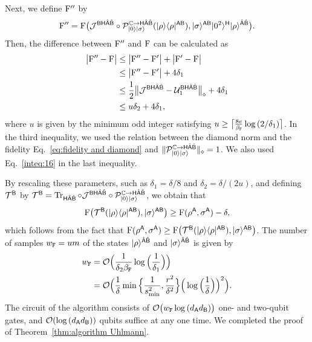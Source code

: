 Next, we define ${\mathrm{F}}''$ by 
\begin{align}
    {\mathrm{F}}'' = {\mathrm{F}}\big({\mathcal{J}}^{{\mathsf{B}}{\mathsf{H}}\hat{{\mathsf{A}}}\hat{{\mathsf{B}}}}\circ{\mathcal{P}}_{|0\rangle|\sigma\rangle}^{\mathbb{C}\rightarrow{\mathsf{H}}\hat{{\mathsf{A}}}\hat{{\mathsf{B}}}}(|\rho\rangle\langle\rho|^{{\mathsf{A}}{\mathsf{B}}}), |\sigma\rangle^{{\mathsf{A}}{\mathsf{B}}}|0^2\rangle^{\mathsf{H}}|\rho\rangle^{\hat{{\mathsf{A}}}\hat{{\mathsf{B}}}}\big).
\end{align} 
Then, the difference between ${\mathrm{F}}''$ and ${\mathrm{F}}$ can be calculated as
\begin{align}
    \big|{\mathrm{F}}'' - {\mathrm{F}}\big| 
    &\leq \big|{\mathrm{F}}'' - {\mathrm{F}}'\big| + \big|{\mathrm{F}}' - {\mathrm{F}}\big| \\
    &\leq\big|{\mathrm{F}}'' - {\mathrm{F}}'\big| + 4\delta_1 \\
    &\leq \frac{1}{2}\big\|{\mathcal{J}}^{{\mathsf{B}}{\mathsf{H}}\hat{{\mathsf{A}}}\hat{{\mathsf{B}}}} - {\mathcal{U}}_1^{{\mathsf{B}}{\mathsf{H}}\hat{{\mathsf{A}}}\hat{{\mathsf{B}}}} \big\|_\diamond + 4\delta_1 \\
    \label{inteq:106}
    &\leq u\delta_2 + 4\delta_1,
\end{align}
where $u$ is given by the minimum odd integer satisfying $u \geq \big\lceil\frac{8e}{\beta_{\mathtt{F}}}\log{(2/\delta_1)}\big\rceil$.
In the third inequality, we used the relation between the diamond norm and the fidelity Eq.~\eqref{eq:fidelity and diamond} and $\|{\mathcal{P}}_{|0\rangle|\sigma\rangle}^{\mathbb{C}\rightarrow{\mathsf{H}}\hat{{\mathsf{A}}}\hat{{\mathsf{B}}}}\|_\diamond = 1$.
We also used Eq.~\eqref{inteq:16} in the last inequality.



By rescaling these parameters, such as $\delta_1 = \delta/8$ and $\delta_2 = \delta/(2u)$, and defining ${\mathcal{T}}^{\mathsf{B}}$ by ${\mathcal{T}}^{\mathsf{B}} = \operatorname{Tr}_{{\mathsf{H}}\hat{{\mathsf{A}}}\hat{{\mathsf{B}}}}\circ{\mathcal{J}}^{{\mathsf{B}}{\mathsf{H}}\hat{{\mathsf{A}}}\hat{{\mathsf{B}}}}\circ{\mathcal{P}}_{|0\rangle|\sigma\rangle}^{\mathbb{C}\rightarrow{\mathsf{H}}\hat{{\mathsf{A}}}\hat{{\mathsf{B}}}}$, we obtain that
\begin{align}
    {\mathrm{F}}\big({\mathcal{T}}^{\mathsf{B}}(|\rho\rangle\langle\rho|^{{\mathsf{A}}{\mathsf{B}}}), |\sigma\rangle^{{\mathsf{A}}{\mathsf{B}}}\big)
    \geq {\mathrm{F}}(\rho^{\mathsf{A}}, \sigma^{\mathsf{A}}) - \delta,
\end{align}
which follows from the fact that ${\mathrm{F}}(\rho^{\mathsf{A}}, \sigma^{\mathsf{A}}) \geq {\mathrm{F}}\big({\mathcal{T}}^{\mathsf{B}}(|\rho\rangle\langle\rho|^{{\mathsf{A}}{\mathsf{B}}}), |\sigma\rangle^{{\mathsf{A}}{\mathsf{B}}}\big)$.
The number of samples $w_{\mathtt{F}} = um$ of the states $|\rho\rangle^{\hat{{\mathsf{A}}}\hat{{\mathsf{B}}}}$ and $|\sigma\rangle^{\hat{{\mathsf{A}}}\hat{{\mathsf{B}}}}$ is given by
\begin{align}
    w_{\mathtt{F}} &= {\mathcal{O}}\Big(\frac{1}{\delta_2\beta_{\mathtt{F}}}\log{\Big(\frac{1}{\delta_1}\Big)}\Big) \\
    &= {\mathcal{O}}\Big(\frac{1}{\delta}\min\Big\{\frac{1}{s_{\rm min}^2}, \frac{r^2}{\delta^2}\Big\}\Big(\log{\Big(\frac{1}{\delta}\Big)}\Big)^2\Big).
\end{align}
The circuit of the algorithm consists of
${\mathcal{O}}\big(w_{\mathtt{F}} \log{(d_{\mathsf{A}}d_{\mathsf{B}})}\big)$ one- and two-qubit gates, and ${\mathcal{O}}(\log{(d_{\mathsf{A}}d_{\mathsf{B}})})$ qubits suffice at any one time.
We completed the proof of Theorem~\ref{thm:algorithm Uhlmann}.




